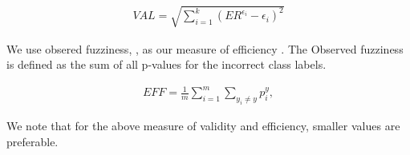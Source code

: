 \documentclass[main]{subfiles}
\begin{document}
\begin{definition}[Validity]
\begin{align} \label{eq:validity}
		VAL = \sqrt{ \sum\limits_{i=1}^{k} (ER^{\epsilon_i} -\epsilon_i)^2 }
\end{align}	 
\end{definition}


We use obsered fuzziness, \cite{vovk2016criteria}, as our measure of efficiency . The Observed fuzziness is defined as the sum of all p-values for the incorrect class labels. %
\begin{definition}[Efficiency]
\begin{align} \label{eq:efficiency}
	EFF =\frac{ 1}{m} \sum\limits_{i=1}^{m} \sum\limits_{y_i \neq y }  p_i^y,		
\end{align}
\end{definition}
We note that for the above measure of validity and efficiency, smaller
values are preferable.
\end{document}
